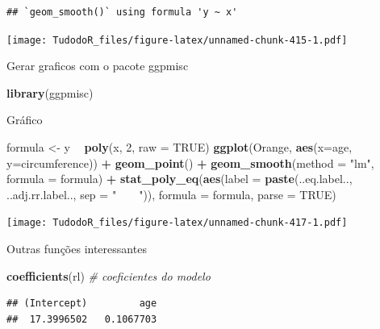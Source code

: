 \documentclass[
]{book}
\newenvironment{Shaded}{\begin{snugshade}}{\end{snugshade}}
\newcommand{\CommentTok}[1]{\textcolor[rgb]{0.56,0.35,0.01}{\textit{#1}}}
\newcommand{\DataTypeTok}[1]{\textcolor[rgb]{0.13,0.29,0.53}{#1}}
\newcommand{\DecValTok}[1]{\textcolor[rgb]{0.00,0.00,0.81}{#1}}
\newcommand{\KeywordTok}[1]{\textcolor[rgb]{0.13,0.29,0.53}{\textbf{#1}}}
\newcommand{\NormalTok}[1]{#1}
\newcommand{\OperatorTok}[1]{\textcolor[rgb]{0.81,0.36,0.00}{\textbf{#1}}}
\newcommand{\OtherTok}[1]{\textcolor[rgb]{0.56,0.35,0.01}{#1}}
\newcommand{\StringTok}[1]{\textcolor[rgb]{0.31,0.60,0.02}{#1}}
\begin{document}
\begin{verbatim}
## `geom_smooth()` using formula 'y ~ x'
\end{verbatim}

\texttt{[image: TudodoR\_files/figure-latex/unnamed-chunk-415-1.pdf]}

Gerar graficos com o pacote ggpmisc

\begin{Shaded}
\begin{Highlighting}[]
\KeywordTok{library}\NormalTok{(ggpmisc)}
\end{Highlighting}
\end{Shaded}

Gráfico

\begin{Shaded}
\begin{Highlighting}[]
\NormalTok{formula <-}\StringTok{ }\NormalTok{y }\OperatorTok{~}\StringTok{ }\KeywordTok{poly}\NormalTok{(x, }\DecValTok{2}\NormalTok{, }\DataTypeTok{raw =} \OtherTok{TRUE}\NormalTok{)}
\KeywordTok{ggplot}\NormalTok{(Orange, }\KeywordTok{aes}\NormalTok{(}\DataTypeTok{x=}\NormalTok{age, }\DataTypeTok{y=}\NormalTok{circumference)) }\OperatorTok{+}
\StringTok{  }\KeywordTok{geom_point}\NormalTok{() }\OperatorTok{+}
\StringTok{  }\KeywordTok{geom_smooth}\NormalTok{(}\DataTypeTok{method =} \StringTok{"lm"}\NormalTok{, }\DataTypeTok{formula =}\NormalTok{ formula) }\OperatorTok{+}
\StringTok{  }\KeywordTok{stat_poly_eq}\NormalTok{(}\KeywordTok{aes}\NormalTok{(}\DataTypeTok{label =}  \KeywordTok{paste}\NormalTok{(..eq.label.., ..adj.rr.label.., }\DataTypeTok{sep =} \StringTok{"~~~~"}\NormalTok{)),}
    \DataTypeTok{formula =}\NormalTok{ formula, }\DataTypeTok{parse =} \OtherTok{TRUE}\NormalTok{)}
\end{Highlighting}
\end{Shaded}

\texttt{[image: TudodoR\_files/figure-latex/unnamed-chunk-417-1.pdf]}

Outras funções interessantes

\begin{Shaded}
\begin{Highlighting}[]
\KeywordTok{coefficients}\NormalTok{(rl) }\CommentTok{# coeficientes do modelo}
\end{Highlighting}
\end{Shaded}

\begin{verbatim}
## (Intercept)         age 
##  17.3996502   0.1067703
\end{verbatim}
\end{document}
